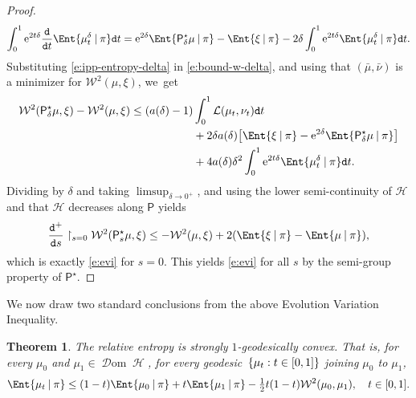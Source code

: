 \documentclass[JEP,XML,SOM,Unicode,published]{cedram}
\newtheorem{theorem}{Theorem}[section]
\theoremstyle{definition}
\theoremstyle{remark}
\DeclarePairedDelimiter{\bracket}{\lbrack}{\rbrack}
\DeclarePairedDelimiter{\set}{\lbrace}{\rbrace}
\newcommand{\given}[1][]{%
\nonscript\:#1\vert
\allowbreak
\nonscript\:
\mathopen{}}
\DeclareMathOperator{\ent}{\mathcal{H}}
\DeclareMathOperator{\dom}{\mathscr{D}om}
\begin{document}
\begin{proof}
\begin{equation}\label{e:ipp-entropy-delta}
\int_{0}^{1} \mathrm{e}^{2t\delta} \frac{\mathtt{d}}{\mathtt{d} t} \Ent{ \mu_{t}^{\delta} \given \pi } \mathtt{d} t = \mathrm{e}^{2\delta} \Ent{ \mathsf{P}^{\star}_{\delta}\mu \given \pi } - \Ent{ \xi \given \pi } - 2 \delta \int_{0}^{1} \mathrm{e}^{2t\delta} \Ent{ \mu_{t}^{\delta} \given \pi } \mathtt{d} t.
\end{equation}
Substituting \cref{e:ipp-entropy-delta} in \cref{e:bound-w-delta}, and using that $(\bar{\mu}, \bar{\nu})$ is a minimizer for $\mathcal{W}^{2}(\mu, \xi)$, we~get
\begin{equation*}
\begin{split}
\mathcal{W}^{2}(\mathsf{P}^{\star}_{\delta}\mu, \xi) - \mathcal{W}^{2}(\mu, \xi) \leq (a(\delta) - 1)& \int_{0}^{1} \mathcal{L}(\mu_{t}, \nu_{t}) \mathtt{d} t \\
&+ 2 \delta a(\delta) \bracket*{ \Ent{ \xi \given \pi } - \mathrm{e}^{2\delta} \Ent{ \mathsf{P}^{\star}_{\delta}\mu \given \pi } } \\
&+ 4 a(\delta) \delta^{2} \int_{0}^{1} \mathrm{e}^{2t\delta} \Ent{ \mu_{t}^{\delta} \given \pi } \mathtt{d} t.
\end{split}
\end{equation*}
Dividing by $\delta$ and taking $\limsup_{\delta \to 0^{+}}$, and using the lower semi-continuity of $\mathcal{H}$ and that $\mathcal{H}$ decreases along $\mathsf{P}$ yields
\begin{equation*}
\frac{\mathtt{d}^{+}}{\mathtt{d} s} \restriction_{s=0} \mathcal{W}^{2}(\mathsf{P}^{\star}_{s}\mu, \xi) \leq -\mathcal{W}^{2}(\mu, \xi) + 2 (\Ent{ \xi \given \pi } - \Ent{ \mu \given \pi }),
\end{equation*}
which is exactly \cref{e:evi} for $s = 0$.
This yields \cref{e:evi} for all $s$ by the semi-group property of $\mathsf{P}^{\star}$.
\end{proof}

We now draw two standard conclusions from the above Evolution Variation Inequality.

\begin{theorem}\label{t:entropy-geodesically-convex}
The relative entropy is strongly $1$-geodesically convex.
That is, for every $\mu_{0}$ and $\mu_{1} \in \dom \ent$, for every geodesic~$\set{ \mu_{t} : t \in [0,1] }$ joining $\mu_{0}$ to $\mu_{1}$,
\begin{equation*}
\Ent{\mu_{t} \given \pi} \leq (1-t) \Ent{\mu_{0} \given \pi} + t \Ent{\mu_{1} \given \pi} - \tfrac{1}{2}t(1-t) \mathcal{W}^{2}(\mu_{0}, \mu_{1}), \quad t \in [0,1].
\end{equation*}
\end{theorem}
\end{document}

